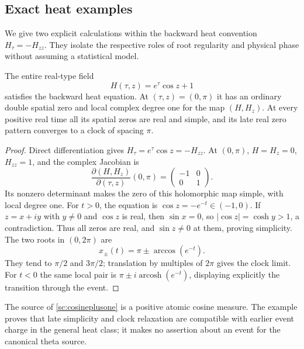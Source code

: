 \subsection{Exact heat examples}
\label{sc:controls}

We give two explicit calculations within the backward heat convention
$H_\tau=-H_{zz}$. They isolate the respective roles of root regularity
and physical phase without assuming a statistical model.

\begin{proposition}
\label{sc:clockcontrol}
The entire real-type field
\begin{equation}
 H(\tau,z)=e^\tau\cos z+1
 \label{sc:cosineplusone}
\end{equation}
satisfies the backward heat equation. At $(\tau,z)=(0,\pi)$ it has an
ordinary double spatial zero and local complex degree one for the map
$(H,H_z)$. At every positive real time all its spatial zeros are real
and simple, and its late real zero pattern converges to a clock of
spacing $\pi$.
\end{proposition}

\begin{proof}
Direct differentiation gives $H_\tau=e^\tau\cos z=-H_{zz}$.
At $(0,\pi)$, $H=H_z=0$, $H_{zz}=1$, and the complex Jacobian is
\[
 \frac{\partial(H,H_z)}{\partial(\tau,z)}(0,\pi)
 =\begin{pmatrix}-1&0\\0&1\end{pmatrix}.
\]
Its nonzero determinant makes the zero of this holomorphic map simple,
with local degree one. For $t>0$, the equation is
$\cos z=-e^{-t}\in(-1,0)$. If $z=x+iy$ with $y\ne0$ and $\cos z$
is real, then $\sin x=0$, so $|\cos z|=\cosh y>1$, a contradiction.
Thus all zeros are real, and $\sin z\ne0$ at them, proving simplicity.
The two roots in $(0,2\pi)$ are
\[
 x_\pm(t)=\pi\pm\arccos(e^{-t}).
\]
They tend to $\pi/2$ and $3\pi/2$; translation by multiples of $2\pi$
gives the clock limit. For $t<0$ the same local pair is
$\pi\pm i\operatorname{arcosh}(e^{-t})$, displaying explicitly the
transition through the event.
\end{proof}

The source of \eqref{sc:cosineplusone} is a positive atomic cosine
measure. The example proves that late simplicity and clock relaxation
are compatible with earlier event charge in the general heat class; it
makes no assertion about an event for the canonical theta source.

